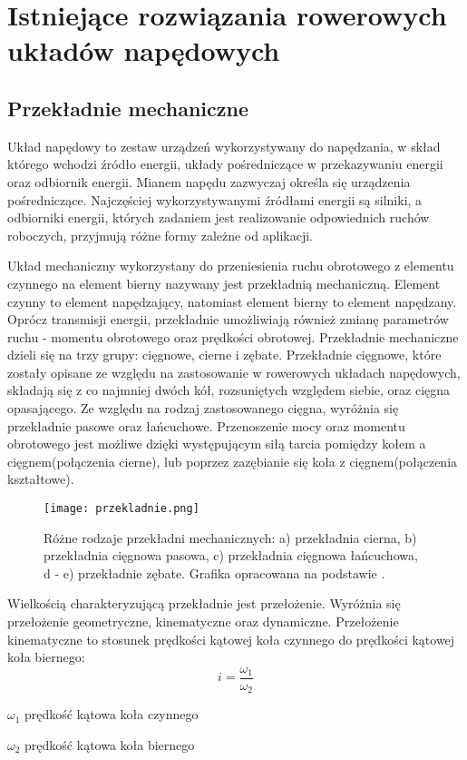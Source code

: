 \chapter{Istniejące rozwiązania rowerowych układów napędowych}

\section{Przekładnie mechaniczne}
Układ napędowy to zestaw urządzeń wykorzystywany do napędzania, w skład którego wchodzi źródło energii, układy pośredniczące w przekazywaniu energii oraz odbiornik energii. Mianem napędu zazwyczaj określa się urządzenia pośredniczące. Najczęściej wykorzystywanymi źródłami energii są silniki, a odbiorniki energii, których zadaniem jest realizowanie odpowiednich ruchów roboczych, przyjmują różne formy zależne od aplikacji.

Układ mechaniczny wykorzystany do przeniesienia ruchu obrotowego z elementu czynnego na element bierny nazywany jest przekładnią mechaniczną. Element czynny to element napędzający, natomiast element bierny to element napędzany. Oprócz transmisji energii, przekładnie umożliwiają również zmianę parametrów ruchu - momentu obrotowego oraz prędkości obrotowej. Przekładnie mechaniczne dzieli się na trzy grupy: cięgnowe, cierne i zębate. Przekładnie cięgnowe, które zostały opisane ze względu na zastosowanie w rowerowych układach napędowych, składają się z co najmniej dwóch kół, rozsuniętych względem siebie, oraz cięgna opasającego. Ze względu na rodzaj zastosowanego cięgna, wyróżnia się przekładnie pasowe oraz łańcuchowe. Przenoszenie mocy oraz momentu obrotowego jest możliwe dzięki występującym siłą tarcia pomiędzy kołem a cięgnem(połączenia cierne), lub poprzez zazębianie się koła z cięgnem(połączenia kształtowe).
\begin{figure}[h]
    \centering
    \texttt{[image: przekladnie.png]}
    \caption{Różne rodzaje przekładni mechanicznych: a) przekładnia cierna, b) przekładnia cięgnowa pasowa, c) przekładnia cięgnowa łańcuchowa, d - e) przekładnie zębate. Grafika opracowana na podstawie \cite{maszyny1}.}
    \label{fig:przekladnia}
\end{figure}

Wielkością charakteryzującą przekładnie jest przełożenie. Wyróżnia się przełożenie geometryczne, kinematyczne oraz dynamiczne. Przełożenie kinematyczne to stosunek prędkości kątowej koła czynnego do prędkości kątowej koła biernego\cite{przekladnie}:
\begin{equation}
    i = \frac{\omega_1}{\omega_2}
    \label{eq:przelozenieKinematyczne}
\end{equation}
\begin{eqwhere}[2cm]
	\item[$\omega_1$] prędkość kątowa koła czynnego
	\item[$\omega_2$] prędkość kątowa koła biernego
\end{eqwhere}

